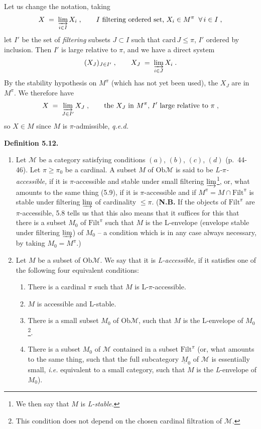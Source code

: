 \documentclass[11pt]{article}
\newcommand{\msp}[1]{\marginpar{\footnotesize [#1]}}
\newcommand{\Filt}{\mathrm{Filt}}
\newcommand{\Ob}{\mathrm{Ob}}
\newcommand{\M}{\mathcal{M}}
\begin{document}
Let us change the notation, taking
\[
X \;=\; \varinjlim_{i \in I} X_i \;, \qquad I \text{ filtering ordered set, } X_i \in M^\pi \;\; \forall\, i \in I \;,
\]
let $I'$ be the set of \textit{filtering} subsets $J \subset I$ such that $\mathrm{card}\, J \leq \pi$, $I'$ ordered by inclusion. Then $I'$ is large relative to $\pi$, and we have a direct system
\[
(X_J)_{J \in I'} \;, \qquad X_J \;=\; \varinjlim_{i \in J} X_i \;.
\]
By the stability hypothesis on $M^\pi$ (which has not yet been used), the $X_J$ are in $M^\pi$. We therefore have
\[
X \;=\; \varinjlim_{J \in I'} X_J \;, \qquad \text{the } X_J \text{ in } M^\pi\text{, } I' \text{ large relative to } \pi \;,
\]
so $X \in M$ since $M$ is $\pi$-admissible, \quad \textit{q.e.d.}

\msp{page 66}

\textbf{Definition 5.12.}
\begin{enumerate}[label={}]
\item[1)] Let $\M$ be a category satisfying conditions $(a)$, $(b)$, $(c)$, $(d)$ (p.~44-46). Let $\pi \geq \pi_0$ be a cardinal. A subset $M$ of $\Ob\M$ is said to be \textit{L-$\pi$-accessible,} if it is $\pi$-accessible and stable under small filtering $\varinjlim$\footnote[24]{We then say that $M$ is \textit{L-stable.}}, or, what amounts to the same thing (5.9), if it is $\pi$-accessible and if $M^\pi = M \cap \Filt^\pi$ is stable under filtering $\varinjlim$ of cardinality $\leq \pi$. (\textbf{N.B.} If the objects of $\Filt^\pi$ are $\pi$-accessible, 5.8 tells us that this also means that it suffices for this that there is a subset $M_0$ of $\Filt^\pi$ such that $M$ is the L-envelope (envelope stable under filtering $\varinjlim$) of $M_0$ -- a condition which is in any case always necessary, by taking $M_0 = M^\pi$.)
\item[2)] Let $M$ be a subset of $\Ob\M$. We say that it is \textit{L-accessible,} if it satisfies one of the following four equivalent conditions:
\begin{enumerate}[label={}]
\item[\textit{a})] There is a cardinal $\pi$ such that $M$ is L-$\pi$-accessible.
\item[\textit{a}$'$)] $M$ is accessible and L-stable.
\item[\textit{b})] There is a small subset $M_0$ of $\Ob\M$, such that $M$ is the L-envelope of $M_0$\footnote[25]{This condition does not depend on the chosen cardinal filtration of $\M$.}.
\item[\textit{b}$'$)] There is a subset $M_0$ of $\M$ contained in a subset $\Filt^\pi$ (or, what amounts to the same thing, such that the full subcategory $\underline{M}_0$ of $\M$ is essentially small, \textit{i.e.} equivalent to a small category, such that $M$ is the \textit{L}-envelope of $M_0$).
\end{enumerate}
\end{enumerate}
\end{document}
